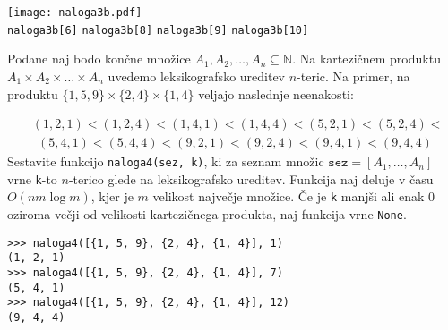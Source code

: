 \documentclass[arhiv]{izpit}
\begin{document}
\begin{center}
  \texttt{[image: naloga3b.pdf]} \\
  \verb|naloga3b[6]|\qquad\quad\qquad
  \verb|naloga3b[8]|\qquad\quad\qquad
  \verb|naloga3b[9]|\qquad\quad\qquad
  \verb|naloga3b[10]|
\end{center}

\naloga[25 točk]

Podane naj bodo končne množice $A_1, A_2, \dots, A_n \subseteq \mathbb{N}$.
Na kartezičnem produktu $A_1 \times A_2 \times \dots \times A_n$ uvedemo leksikografsko ureditev $n$-teric.
Na primer, na produktu $\{1, 5, 9\} \times \{2, 4\} \times \{1, 4\}$ veljajo naslednje neenakosti:

\begin{align*}
  &(1, 2, 1) < (1, 2, 4) < (1, 4, 1) < (1, 4, 4) < (5, 2, 1) < (5, 2, 4) < \\
  &\ \ (5, 4, 1) < (5, 4, 4) < (9, 2, 1) < (9, 2, 4) < (9, 4, 1) < (9, 4, 4)
\end{align*}
%
Sestavite funkcijo \verb|naloga4(sez, k)|,
ki za seznam množic $\mathtt{sez} = [A_1, \dots, A_n]$
vrne \verb|k|-to $n$-terico glede na leksikografsko ureditev.
Funkcija naj deluje v času $O(n m \log m)$, kjer je $m$ velikost največje množice.
Če je \verb|k| manjši ali enak $0$ oziroma večji od velikosti kartezičnega produkta, naj funkcija vrne \verb|None|.

\begin{verbatim}
>>> naloga4([{1, 5, 9}, {2, 4}, {1, 4}], 1)
(1, 2, 1)
>>> naloga4([{1, 5, 9}, {2, 4}, {1, 4}], 7)
(5, 4, 1)
>>> naloga4([{1, 5, 9}, {2, 4}, {1, 4}], 12)
(9, 4, 4)
\end{verbatim}
\end{document}
